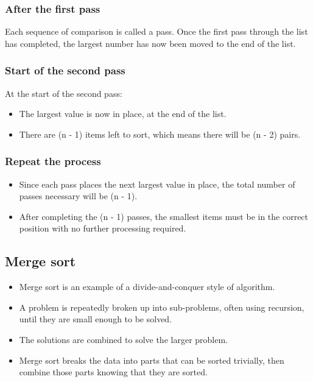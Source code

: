 \documentclass[11pt]{article}
\begin{document}
\subsubsection{After the first pass}
\label{sec:orgba709fc}
Each sequence of comparison is called a pass. Once the first pass through the list has completed, the largest number has now been moved to the end of the list.

\subsubsection{Start of the second pass}
\label{sec:org7758d2c}
At the start of the second pass:
\begin{itemize}
\item The largest value is now in place, at the end of the list.
\item There are (n - 1) items left to sort, which means there will be (n - 2) pairs.
\end{itemize}

\subsubsection{Repeat the process}
\label{sec:org8efdec2}
\begin{itemize}
\item Since each pass places the next largest value in place, the total number of passes necessary will be (n - 1).
\item After completing the (n - 1) passes, the smallest items must be in the correct position with no further processing required.
\end{itemize}

 \newpage

\subsection{Merge sort}
\label{sec:org243a533}
\begin{itemize}
\item Merge sort is an example of a divide-and-conquer style of algorithm.
\item A problem is repeatedly broken up into sub-problems, often using recursion, until they are small enough to be solved.
\item The solutions are combined to solve the larger problem.
\item Merge sort breaks the data into parts that can be sorted trivially, then combine those parts knowing that they are sorted.
\end{itemize}
\end{document}
